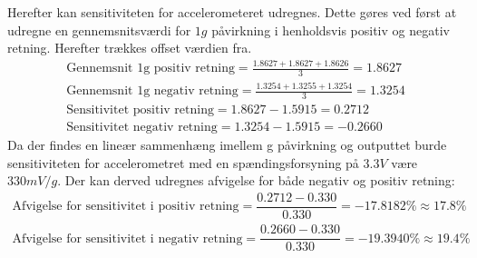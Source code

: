 \noindent Herefter kan sensitiviteten for accelerometeret udregnes. Dette gøres ved først at udregne en gennemsnitsværdi for $1g$ påvirkning i henholdsvis positiv og negativ retning. Herefter trækkes offset værdien fra.
\begin{align}
	\text{Gennemsnit 1g positiv retning} = \frac{1.8627 + 1.8627 + 1.8626}{3} = 1.8627 \\
	\text{Gennemsnit 1g negativ retning} = \frac{1.3254 + 1.3255 + 1.3254}{3} = 1.3254 \\
	\text{Sensitivitet positiv retning} = 1.8627 - 1.5915 = 0.2712 \\
	\text{Sensitivitet negativ retning} = 1.3254 - 1.5915 = -0.2660
\end{align}
\noindent Da der findes en lineær sammenhæng imellem g påvirkning og outputtet burde sensitiviteten for accelerometret med en spændingsforsyning på $3.3V$ være $330mV/g$. Der kan derved udregnes afvigelse for både negativ og positiv retning:
\begin{align}
	\text{Afvigelse for sensitivitet i positiv retning} = \dfrac{0.2712 - 0.330}{0.330} = -17.8182\% \approx 17.8\% \\
	\text{Afvigelse for sensitivitet i negativ retning} = \dfrac{0.2660 - 0.330}{0.330} = -19.3940\% \approx 19.4\%
\end{align}

